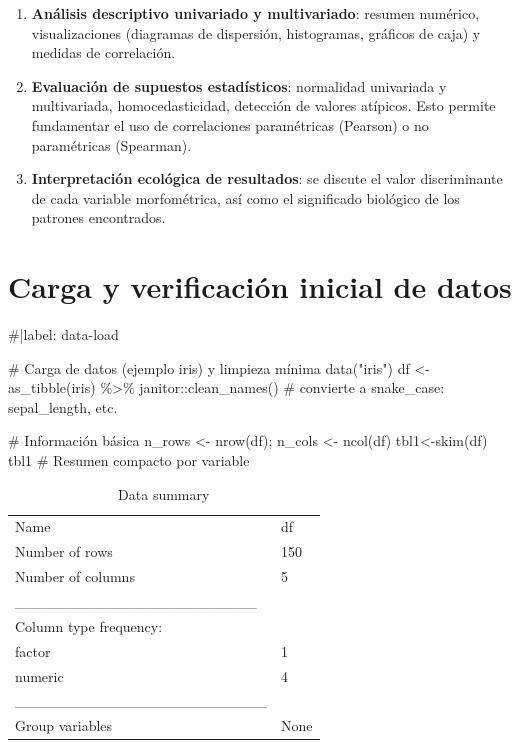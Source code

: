 \documentclass[
  spanish,
  11pt,
  a4paper,
  DIV=11,
  numbers=noendperiod]{scrartcl}
\newenvironment{Shaded}{\begin{snugshade}}{\end{snugshade}}
\newcommand{\CommentTok}[1]{\textcolor[rgb]{0.37,0.37,0.37}{#1}}
\newcommand{\FunctionTok}[1]{\textcolor[rgb]{0.28,0.35,0.67}{#1}}
\newcommand{\NormalTok}[1]{\textcolor[rgb]{0.00,0.23,0.31}{#1}}
\newcommand{\OtherTok}[1]{\textcolor[rgb]{0.00,0.23,0.31}{#1}}
\newcommand{\SpecialCharTok}[1]{\textcolor[rgb]{0.37,0.37,0.37}{#1}}
\newcommand{\StringTok}[1]{\textcolor[rgb]{0.13,0.47,0.30}{#1}}
\providecommand{\tightlist}{%
  \setlength{\itemsep}{0pt}\setlength{\parskip}{0pt}}
\begin{document}
\begin{enumerate}
\def\labelenumi{\arabic{enumi}.}
\tightlist
\item
  \textbf{Análisis descriptivo univariado y multivariado}: resumen
  numérico, visualizaciones (diagramas de dispersión, histogramas,
  gráficos de caja) y medidas de correlación.\\
\item
  \textbf{Evaluación de supuestos estadísticos}: normalidad univariada y
  multivariada, homocedasticidad, detección de valores atípicos. Esto
  permite fundamentar el uso de correlaciones paramétricas (Pearson) o
  no paramétricas (Spearman).\\
\item
  \textbf{Interpretación ecológica de resultados}: se discute el valor
  discriminante de cada variable morfométrica, así como el significado
  biológico de los patrones encontrados.
\end{enumerate}

\section{Carga y verificación inicial de
datos}\label{carga-y-verificaciuxf3n-inicial-de-datos}

\begin{Shaded}
\begin{Highlighting}[numbers=left,,]
\CommentTok{\#|label: data{-}load}

\CommentTok{\# Carga de datos (ejemplo iris) y limpieza mínima}
\FunctionTok{data}\NormalTok{(}\StringTok{"iris"}\NormalTok{)}
\NormalTok{df }\OtherTok{\textless{}{-}} \FunctionTok{as\_tibble}\NormalTok{(iris) }\SpecialCharTok{\%\textgreater{}\%} 
\NormalTok{  janitor}\SpecialCharTok{::}\FunctionTok{clean\_names}\NormalTok{()   }\CommentTok{\# convierte a snake\_case: sepal\_length, etc.}

\CommentTok{\# Información básica}
\NormalTok{n\_rows }\OtherTok{\textless{}{-}} \FunctionTok{nrow}\NormalTok{(df); n\_cols }\OtherTok{\textless{}{-}} \FunctionTok{ncol}\NormalTok{(df)}
\NormalTok{tbl1}\OtherTok{\textless{}{-}}\FunctionTok{skim}\NormalTok{(df) }
\NormalTok{tbl1 }\CommentTok{\# Resumen compacto por variable}
\end{Highlighting}
\end{Shaded}

\begin{longtable}[]{@{}ll@{}}
\caption{Data summary}\tabularnewline
\toprule\noalign{}
\endfirsthead
\endhead
\bottomrule\noalign{}
\endlastfoot
Name & df \\
Number of rows & 150 \\
Number of columns & 5 \\
\_\_\_\_\_\_\_\_\_\_\_\_\_\_\_\_\_\_\_\_\_\_\_ & \\
Column type frequency: & \\
factor & 1 \\
numeric & 4 \\
\_\_\_\_\_\_\_\_\_\_\_\_\_\_\_\_\_\_\_\_\_\_\_\_ & \\
Group variables & None \\
\end{longtable}
\end{document}
